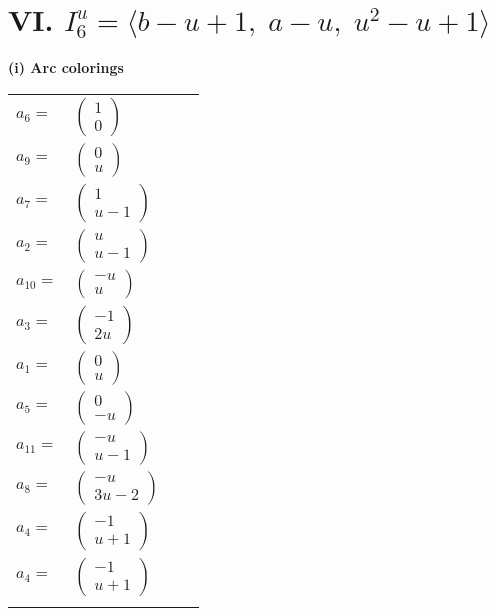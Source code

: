 \documentclass[1p]{elsarticle_modified}
\theoremstyle{definition}
\begin{document}
\centering \section*{VI. $I^u_{6}= \langle b- u+1,\;a- u,\;u^2- u+1 \rangle$}
\flushleft \textbf{(i) Arc colorings}\\
\begin{tabular}{m{7pt} m{180pt} m{7pt} m{180pt} }
\flushright $a_{6}=$&$\begin{pmatrix}1\\0\end{pmatrix}$ \\
\flushright $a_{9}=$&$\begin{pmatrix}0\\u\end{pmatrix}$ \\
\flushright $a_{7}=$&$\begin{pmatrix}1\\u-1\end{pmatrix}$ \\
\flushright $a_{2}=$&$\begin{pmatrix}u\\u-1\end{pmatrix}$ \\
\flushright $a_{10}=$&$\begin{pmatrix}- u\\u\end{pmatrix}$ \\
\flushright $a_{3}=$&$\begin{pmatrix}-1\\2 u\end{pmatrix}$ \\
\flushright $a_{1}=$&$\begin{pmatrix}0\\u\end{pmatrix}$ \\
\flushright $a_{5}=$&$\begin{pmatrix}0\\- u\end{pmatrix}$ \\
\flushright $a_{11}=$&$\begin{pmatrix}- u\\u-1\end{pmatrix}$ \\
\flushright $a_{8}=$&$\begin{pmatrix}- u\\3 u-2\end{pmatrix}$ \\
\flushright $a_{4}=$&$\begin{pmatrix}-1\\u+1\end{pmatrix}$\\ \flushright $a_{4}=$&$\begin{pmatrix}-1\\u+1\end{pmatrix}$\\&\end{tabular}
\end{document}
